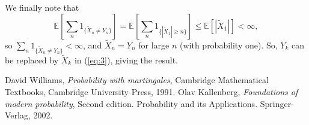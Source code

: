 \documentclass[12pt]{article}
\begin{document}
We finally note that
\begin{equation*}
\mathbb{E}\left[\sum_n1_{\{\tilde X_n\not=Y_n\}}\right]=\mathbb{E}\left[\sum_n1_{\{|\tilde X_1|\ge n\}}\right]\le\mathbb{E}[|\tilde X_1|]<\infty,
\end{equation*}
so $\sum_n1_{\{\tilde X_n\not=Y_n\}}<\infty$, and $\tilde X_n=Y_n$ for large $n$ (with probability one). So, $Y_k$ can be replaced by $\tilde X_k$ in (\ref{eq:3}), giving the result.

\begin{thebibliography}{9}
David Williams, \emph{Probability with martingales},
Cambridge Mathematical Textbooks, Cambridge University Press, 1991.
Olav Kallenberg, \emph{Foundations of modern probability}, Second edition. Probability and its Applications. Springer-Verlag, 2002.
\end{thebibliography}

\end{document}
